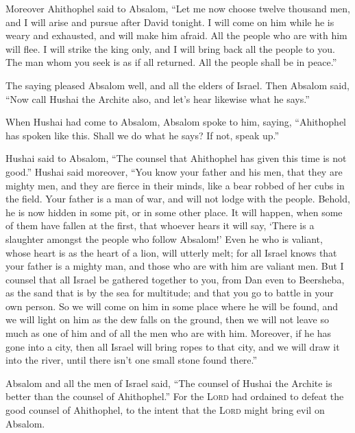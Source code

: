  Moreover Ahithophel said to Absalom, ``Let me now choose
twelve thousand men, and I will arise and pursue after David tonight.
 I will come on him while he is weary and exhausted, and
will make him afraid. All the people who are with him will flee. I will
strike the king only,  and I will bring back all the
people to you. The man whom you seek is as if all returned. All the
people shall be in peace.''

 The saying pleased Absalom well, and all the elders of
Israel.  Then Absalom said, ``Now call Hushai the Archite
also, and let's hear likewise what he says.''

 When Hushai had come to Absalom, Absalom spoke to him,
saying, ``Ahithophel has spoken like this. Shall we do what he says? If
not, speak up.''

 Hushai said to Absalom, ``The counsel that Ahithophel has
given this time is not good.''  Hushai said moreover,
``You know your father and his men, that they are mighty men, and they
are fierce in their minds, like a bear robbed of her cubs in the field.
Your father is a man of war, and will not lodge with the people.
 Behold, he is now hidden in some pit, or in some other
place. It will happen, when some of them have fallen at the first, that
whoever hears it will say, `There is a slaughter amongst the people who
follow Absalom!'  Even he who is valiant, whose heart is
as the heart of a lion, will utterly melt; for all Israel knows that
your father is a mighty man, and those who are with him are valiant men.
 But I counsel that all Israel be gathered together to
you, from Dan even to Beersheba, as the sand that is by the sea for
multitude; and that you go to battle in your own person. 
So we will come on him in some place where he will be found, and we will
light on him as the dew falls on the ground, then we will not leave so
much as one of him and of all the men who are with him. 
Moreover, if he has gone into a city, then all Israel will bring ropes
to that city, and we will draw it into the river, until there isn't one
small stone found there.''

 Absalom and all the men of Israel said, ``The counsel of
Hushai the Archite is better than the counsel of Ahithophel.'' For the
\textsc{Lord} had ordained to defeat the good counsel of Ahithophel, to
the intent that the \textsc{Lord} might bring evil on Absalom.


